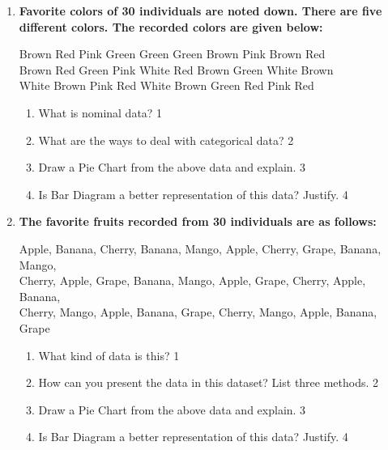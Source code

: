 \documentclass[a4paper,oneside]{book}
\begin{document}
\begin{enumerate}
     \item
	  \textbf{Favorite colors of 30 individuals are noted down. There are five different colors. The recorded colors are given below:}
	  
	  \begin{centering}
	  Brown Red   Pink  Green Green Green Brown Pink  Brown Red   \\
    Brown Red   Green Pink  White Red   Brown Green White Brown \\
    White Brown Pink  Red   White Brown Green Red   Pink  Red  \\
    \end{centering}
    
  
  \begin{enumerate}
    \item
	What is nominal data? \hfill 1
    \item
	What are the ways to deal with categorical data? \hfill 2
    \item  
	Draw a Pie Chart from the above data and explain. \hfill 3
    \item
	Is Bar Diagram a better representation of this data? Justify. \hfill 4
  \end{enumerate}
  
  \item
	  \textbf{The favorite fruits recorded from 30 individuals are as follows:} 
	  
	   \begin{centering}
    Apple, Banana, Cherry, Banana, Mango, Apple, Cherry, Grape, Banana, Mango, \\
    Cherry, Apple, Grape, Banana, Mango, Apple, Grape, Cherry, Apple, Banana, \\
    Cherry, Mango, Apple, Banana, Grape, Cherry, Mango, Apple, Banana, Grape \\
    \end{centering}
  
  \begin{enumerate}
    \item
	What kind of data is this? \hfill 1
    \item
	How can you present the data in this dataset? List three methods. \hfill 2
    \item  
	Draw a Pie Chart from the above data and explain. \hfill 3
    \item
	Is Bar Diagram a better representation of this data? Justify. \hfill 4
  \end{enumerate}
  

\end{enumerate}
\end{document}
